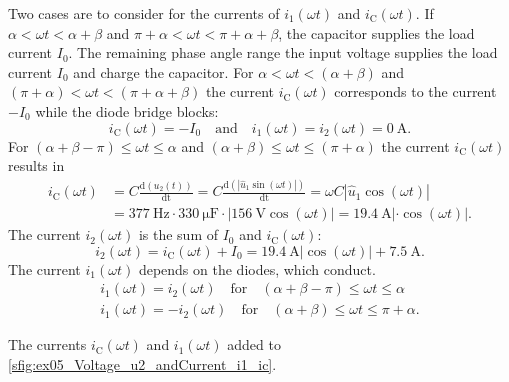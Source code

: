 \begin{solutionblock}
    Two cases are to consider for the currents of $i_\mathrm{1}(\omega t)$ and  $i_\mathrm{C}(\omega t)$. If $\alpha<\omega t<\alpha+\beta$
    and $\pi+\alpha<\omega t<\pi+\alpha+\beta$, the capacitor supplies the load current $I_{\mathrm{0}}$.
    The remaining phase angle range the input voltage supplies the load current $I_{\mathrm{0}}$ and charge the capacitor.
    For $\alpha<\omega t<(\alpha+\beta)$ and $(\pi+\alpha)<\omega t<(\pi+\alpha+\beta)$ the current $i_\mathrm{C}(\omega t)$ 
    corresponds to the current $-I_{\mathrm{0}}$ while the diode bridge blocks:
    \begin{equation} 
        i_\mathrm{C}(\omega t)=-I_{\mathrm{0}} \quad \text{and} \quad i_\mathrm{1}(\omega t)= i_\mathrm{2}(\omega t)= \SI{0}{\ampere}.
    \end{equation}
    For $(\alpha+\beta-\pi)\leq\omega t\leq\alpha$ and $(\alpha+\beta)\leq\omega t\leq(\pi+\alpha)$ the current $i_\mathrm{C}(\omega t)$ results in
    \begin{equation}
        \begin{aligned}
            i_\mathrm{C}(\omega t)&=C\frac{\mathrm{d}(u_\mathrm{2}(t))}{\mathrm{dt}}=C\frac{\mathrm{d}(\left| \hat{u}_\mathrm{1}\sin(\omega t)\right|)}{\mathrm{dt}}
            = \omega C \left|\hat{u}_\mathrm{1}\cos(\omega t)\right|  \\
            &= \SI{377}{\hertz} \cdot \SI{330}{\micro\farad} \cdot  \left|\SI{156}{\volt}\cos(\omega t)\right|
            =\SI{19.4}{\ampere}\left| \cdot \cos(\omega t)\right|.
        \end{aligned}
    \end{equation}
    The current $i_\mathrm{2}(\omega t)$ is the sum of $I_{\mathrm{0}}$ and $i_\mathrm{C}(\omega t)$:
    \begin{equation} 
        i_\mathrm{2}(\omega t)=i_\mathrm{C}(\omega t) + I_{\mathrm{0}}=\SI{19.4}{\ampere}\left|\cos(\omega t)\right| + \SI{7.5}{\ampere}.
    \end{equation}
    The current $i_\mathrm{1}(\omega t)$ depends on the diodes, which conduct.
    \begin{equation}
        \begin{split}
            i_\mathrm{1}(\omega t)=i_\mathrm{2}(\omega t) \quad \text{for} \quad (\alpha+\beta-\pi)\leq\omega t\leq\alpha \\
            i_\mathrm{1}(\omega t)=-i_\mathrm{2}(\omega t) \quad \text{for} \quad (\alpha+\beta)\leq\omega t\leq\pi+\alpha.
        \end{split}
    \end{equation}

    The currents $i_\mathrm{C}(\omega t)$ and $i_\mathrm{1}(\omega t)$ added to \autoref{sfig:ex05_Voltage_u2_andCurrent_i1_ic}.

\end{solutionblock}

